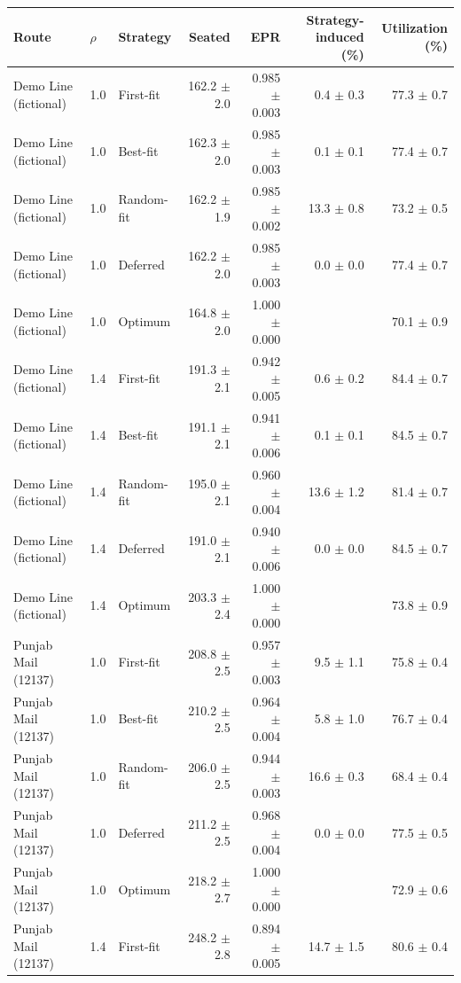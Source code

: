 \begin{tabular}{lllrrrr}
\hline
Route & $\rho$ & Strategy & Seated & EPR & Strategy-induced (\%) & Utilization (\%) \\
\hline
Demo Line (fictional) & 1.0 & First-fit & 162.2 $\pm$ 2.0 & 0.985 $\pm$ 0.003 & 0.4 $\pm$ 0.3 & 77.3 $\pm$ 0.7 \\
Demo Line (fictional) & 1.0 & Best-fit & 162.3 $\pm$ 2.0 & 0.985 $\pm$ 0.003 & 0.1 $\pm$ 0.1 & 77.4 $\pm$ 0.7 \\
Demo Line (fictional) & 1.0 & Random-fit & 162.2 $\pm$ 1.9 & 0.985 $\pm$ 0.002 & 13.3 $\pm$ 0.8 & 73.2 $\pm$ 0.5 \\
Demo Line (fictional) & 1.0 & Deferred & 162.2 $\pm$ 2.0 & 0.985 $\pm$ 0.003 & 0.0 $\pm$ 0.0 & 77.4 $\pm$ 0.7 \\
Demo Line (fictional) & 1.0 & Optimum & 164.8 $\pm$ 2.0 & 1.000 $\pm$ 0.000 &  & 70.1 $\pm$ 0.9 \\
Demo Line (fictional) & 1.4 & First-fit & 191.3 $\pm$ 2.1 & 0.942 $\pm$ 0.005 & 0.6 $\pm$ 0.2 & 84.4 $\pm$ 0.7 \\
Demo Line (fictional) & 1.4 & Best-fit & 191.1 $\pm$ 2.1 & 0.941 $\pm$ 0.006 & 0.1 $\pm$ 0.1 & 84.5 $\pm$ 0.7 \\
Demo Line (fictional) & 1.4 & Random-fit & 195.0 $\pm$ 2.1 & 0.960 $\pm$ 0.004 & 13.6 $\pm$ 1.2 & 81.4 $\pm$ 0.7 \\
Demo Line (fictional) & 1.4 & Deferred & 191.0 $\pm$ 2.1 & 0.940 $\pm$ 0.006 & 0.0 $\pm$ 0.0 & 84.5 $\pm$ 0.7 \\
Demo Line (fictional) & 1.4 & Optimum & 203.3 $\pm$ 2.4 & 1.000 $\pm$ 0.000 &  & 73.8 $\pm$ 0.9 \\
Punjab Mail (12137) & 1.0 & First-fit & 208.8 $\pm$ 2.5 & 0.957 $\pm$ 0.003 & 9.5 $\pm$ 1.1 & 75.8 $\pm$ 0.4 \\
Punjab Mail (12137) & 1.0 & Best-fit & 210.2 $\pm$ 2.5 & 0.964 $\pm$ 0.004 & 5.8 $\pm$ 1.0 & 76.7 $\pm$ 0.4 \\
Punjab Mail (12137) & 1.0 & Random-fit & 206.0 $\pm$ 2.5 & 0.944 $\pm$ 0.003 & 16.6 $\pm$ 0.3 & 68.4 $\pm$ 0.4 \\
Punjab Mail (12137) & 1.0 & Deferred & 211.2 $\pm$ 2.5 & 0.968 $\pm$ 0.004 & 0.0 $\pm$ 0.0 & 77.5 $\pm$ 0.5 \\
Punjab Mail (12137) & 1.0 & Optimum & 218.2 $\pm$ 2.7 & 1.000 $\pm$ 0.000 &  & 72.9 $\pm$ 0.6 \\
Punjab Mail (12137) & 1.4 & First-fit & 248.2 $\pm$ 2.8 & 0.894 $\pm$ 0.005 & 14.7 $\pm$ 1.5 & 80.6 $\pm$ 0.4 \\

\end{tabular}
